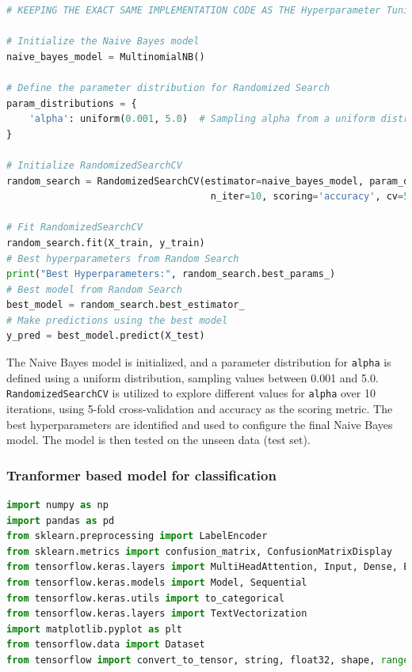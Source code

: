 \begin{tcolorbox}[colback=gray!5!white, colframe=gray!80!black, boxrule=0.5pt, title=Naive Bayes]
    \begin{lstlisting}[language=Python]
# KEEPING THE EXACT SAME IMPLEMENTATION CODE AS THE Hyperparameter Tuning ON LOGISTIC REGRESSION

# Initialize the Naive Bayes model
naive_bayes_model = MultinomialNB()

# Define the parameter distribution for Randomized Search
param_distributions = {
    'alpha': uniform(0.001, 5.0)  # Sampling alpha from a uniform distribution
}

# Initialize RandomizedSearchCV
random_search = RandomizedSearchCV(estimator=naive_bayes_model, param_distributions=param_distributions,
                                    n_iter=10, scoring='accuracy', cv=5, n_jobs=-1, random_state=42)

# Fit RandomizedSearchCV
random_search.fit(X_train, y_train)
# Best hyperparameters from Random Search
print("Best Hyperparameters:", random_search.best_params_)
# Best model from Random Search
best_model = random_search.best_estimator_
# Make predictions using the best model
y_pred = best_model.predict(X_test)
    \end{lstlisting}
\end{tcolorbox}

\noindent
 The Naive Bayes model is initialized, and a parameter distribution for \texttt{alpha} is defined using a uniform distribution, sampling values between 0.001 and 5.0. \texttt{RandomizedSearchCV} is utilized to explore different values for \texttt{alpha} over 10 iterations, using 5-fold cross-validation and accuracy as the scoring metric. The best hyperparameters are identified and used to configure the final Naive Bayes model. The model is then tested on the unseen data (test set).

\subsubsection{Tranformer based model for classification}

\begin{tcolorbox}[colback=gray!5!white, colframe=gray!80!black, boxrule=0.5pt, title=Importing Libraries]
    \begin{lstlisting}[language=Python]
import numpy as np
import pandas as pd
from sklearn.preprocessing import LabelEncoder
from sklearn.metrics import confusion_matrix, ConfusionMatrixDisplay
from tensorflow.keras.layers import MultiHeadAttention, Input, Dense, Embedding, GlobalAveragePooling1D, LayerNormalization, Layer
from tensorflow.keras.models import Model, Sequential
from tensorflow.keras.utils import to_categorical
from tensorflow.keras.layers import TextVectorization
import matplotlib.pyplot as plt
from tensorflow.data import Dataset
from tensorflow import convert_to_tensor, string, float32, shape, range, reshape
    \end{lstlisting}
\end{tcolorbox}

